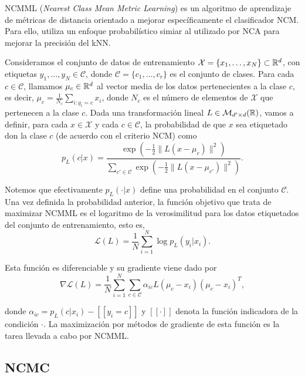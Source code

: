 NCMML (\emph{Nearest Class Mean Metric Learning}) \cite{ncmml} es un algoritmo de aprendizaje de métricas de distancia orientado a mejorar específicamente el clasificador NCM. Para ello, utiliza un enfoque probabilístico simiar al utilizado por NCA para mejorar la precisión del kNN.

Consideramos el conjunto de datos de entrenamiento $\mathcal{X} = \{x_1,\dots,x_N\} \subset \mathbb{R}^d$, con etiquetas $y_1,\dots,y_N \in \mathcal{C}$, donde $\mathcal{C} = \{c_1,\dots,c_r\}$ es el conjunto de clases. Para cada $c \in \mathcal{C}$, llamamos $\mu_c \in \mathbb{R}^d$ al vector media de los datos pertenecientes a la clase $c$, es decir, $\mu_c = \frac{1}{N_c}\sum_{i\colon y_i = c}x_i$, donde $N_c$ es el número de elementos de $\mathcal{X}$ que pertenecen a la clase $c$. Dada una transformación lineal $L \in \mathcal{M}_{d'\times d}(\mathbb{R})$, vamos a definir, para cada $x \in \mathcal{X}$ y cada $c \in \mathcal{C}$, la probabilidad de que $x$ sea etiquetado don la clase $c$ (de acuerdo con el criterio NCM) como
\begin{equation}
    p_L(c|x) = \frac{\exp\left(-\frac{1}{2} \|L(x - \mu_c)\|^2\right)}{\sum\limits_{c' \in \mathcal{C}} \exp\left(-\frac{1}{2} \|L(x - \mu_{c'})\|^2\right)}.
\end{equation} 

Notemos que efectivamente $p_L(\cdot|x)$ define una probabilidad en el conjunto $\mathcal{C}$. Una vez definida la probabilidad anterior, la función objetivo que trata de maximizar NCMML es el logaritmo de la verosimilitud para los datos etiquetados del conjunto de entrenamiento, esto es,
\begin{equation}
\mathcal{L}(L) = \frac{1}{N}\sum_{i=1}^N\log p_L(y_i|x_i).
\end{equation} 

Esta función es diferenciable y su gradiente viene dado por
\begin{equation}
\nabla \mathcal{L}(L) = \frac{1}{N} \sum_{i=1}^N \sum\limits_{c\in \mathcal{C}} \alpha_{ic} L (\mu_c - x_i)(\mu_c - x_i)^T,
\end{equation}

donde $\alpha_{ic} = p_L(c|x_i) - [\![ y_i = c ]\!]$ y $[\![ \cdot ]\!]$ denota la función indicadora de la condición $\cdot$. La maximización por métodos de gradiente de esta función es la tarea llevada a cabo por NCMML.



\subsection{NCMC} \label{section:ncmc}

